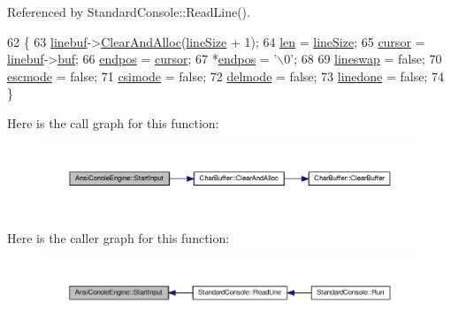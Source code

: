 Referenced by Standard\+Console\+::\+Read\+Line().


\begin{DoxyCode}
62 \{
63     \hyperlink{classAnsiConoleEngine_a6bf88afa72a458e3687972f9e666cd86}{linebuf}->\hyperlink{classCharBuffer_a8c0927c2c05c954161151045f68581c6}{ClearAndAlloc}(\hyperlink{classAnsiConoleEngine_a59042210f69050bdfb531841e8ac0927}{lineSize} + 1);
64     \hyperlink{classAnsiConoleEngine_ad5d65280df848947f5b2dda80dcf35c6}{len} = \hyperlink{classAnsiConoleEngine_a59042210f69050bdfb531841e8ac0927}{lineSize};
65     \hyperlink{classAnsiConoleEngine_aea3df1b13bc8ecf2eb68ec693249800f}{cursor} = \hyperlink{classAnsiConoleEngine_a6bf88afa72a458e3687972f9e666cd86}{linebuf}->\hyperlink{classCharBuffer_a8bcd8491b24db4197b311eb361609674}{buf};
66     \hyperlink{classAnsiConoleEngine_a28852245082570631c7392411fec89cc}{endpos} = \hyperlink{classAnsiConoleEngine_aea3df1b13bc8ecf2eb68ec693249800f}{cursor};
67     *\hyperlink{classAnsiConoleEngine_a28852245082570631c7392411fec89cc}{endpos} = \textcolor{charliteral}{'\(\backslash\)0'};
68 
69     \hyperlink{classAnsiConoleEngine_a23b1b0d4714995d12e7b0aacdecfa0c4}{lineswap} = \textcolor{keyword}{false};
70     \hyperlink{classAnsiConoleEngine_af497f5cbdca8bbc350935a90568b06e7}{escmode} = \textcolor{keyword}{false};
71     \hyperlink{classAnsiConoleEngine_adf2036857a6c6de85836ee2e7b3e5d6d}{csimode} = \textcolor{keyword}{false};
72     \hyperlink{classAnsiConoleEngine_a5182d9a19cc1fe8681a9faf77a156657}{delmode} = \textcolor{keyword}{false};
73     \hyperlink{classAnsiConoleEngine_a0931686f3224f07bd3a3fe25c06e32c6}{linedone} = \textcolor{keyword}{false};
74 \}
\end{DoxyCode}


Here is the call graph for this function\+:\nopagebreak
\begin{figure}[H]
\begin{center}
\leavevmode
\includegraphics[width=350pt]{classAnsiConoleEngine_a8ad01a2ddd3ee5182deb4a74f3d2a0c1_cgraph}
\end{center}
\end{figure}




Here is the caller graph for this function\+:\nopagebreak
\begin{figure}[H]
\begin{center}
\leavevmode
\includegraphics[width=350pt]{classAnsiConoleEngine_a8ad01a2ddd3ee5182deb4a74f3d2a0c1_icgraph}
\end{center}
\end{figure}




